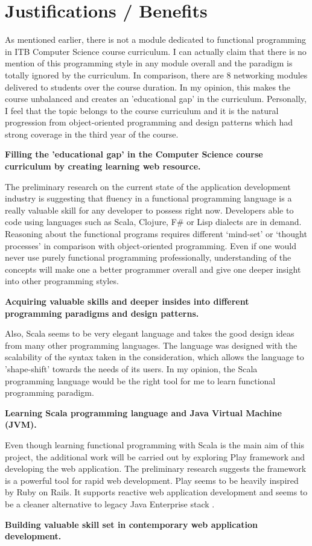 \documentclass[12pt,twoside,a4paper]{report}
\begin{document}
\section{Justifications / Benefits}\label{1.4}
As mentioned earlier, there is not a module dedicated to functional programming in ITB Computer Science course curriculum. I can actually claim that there is no mention of this programming style in any module overall and the paradigm is totally ignored by the curriculum. In comparison, there are 8 networking modules delivered to students over the course duration. In my opinion, this makes the course unbalanced and creates an 'educational gap' in the curriculum. Personally, I feel that the topic belongs to the course curriculum and it is the natural progression from object-oriented programming and design patterns which had strong coverage in the third year of the course.\par
\textbullet \textbf{ Filling the 'educational gap' in the Computer Science course curriculum by creating learning web resource.}\par
The preliminary research on the current state of the application development industry is suggesting that fluency in a functional programming language is a really valuable skill for any developer to possess right now. Developers able to code using languages such as Scala, Clojure, F\# or Lisp dialects are in demand. Reasoning about the functional programs requires different ‘mind-set’ or ‘thought processes’ in comparison with object-oriented programming. Even if one would never use purely functional programming professionally, understanding of the concepts will make one a better programmer overall and give one deeper insight into other programming styles.\par
\textbullet \textbf{ Acquiring valuable skills and deeper insides into different programming paradigms and design patterns.}\par
Also, Scala seems to be very elegant language and takes the good design ideas from many other programming languages. The language was designed with the scalability of the syntax taken in the consideration, which allows the language to 'shape-shift' towards the needs of its users. In my opinion, the Scala programming language would be the right tool for me to learn functional programming paradigm.\par
\textbullet \textbf{ Learning Scala programming language and Java Virtual Machine (JVM).}\par
Even though learning functional programming with Scala is the main aim of this project, the additional work will be carried out by exploring Play framework and developing the web application. The preliminary research suggests the framework is a powerful tool for rapid web development. Play seems to be heavily inspired by Ruby on Rails. It supports reactive web application development and seems to be a cleaner alternative to legacy Java Enterprise stack \cite{8}.\par
\textbullet \textbf{ Building valuable skill set in contemporary web application development.}
\end{document}
